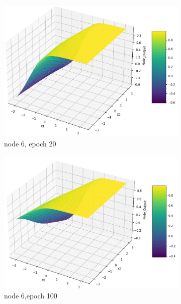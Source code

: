 \documentclass[11pt]{article}
\begin{document}
\begin{figure}[h!]
\begin{subfigure}[b]{0.3\textwidth}
	\includegraphics[scale=0.14]{hidden2_n6_e20.jpg}
	\caption{node 6, epoch 20}
	\label{fig:fig2.1.7.13}
	\end{subfigure}
	\begin{subfigure}[b]{0.45\textwidth}
	\centering
	\includegraphics[scale=0.14]{hidden2_n6_e100.jpg}
	\caption{node 6,epoch 100}
	\label{fig:fig2.1.7.14}
	\end{subfigure}
	\begin{subfigure}[b]{0.45\textwidth}
	\centering

\end{subfigure}
\end{figure}
\end{document}
